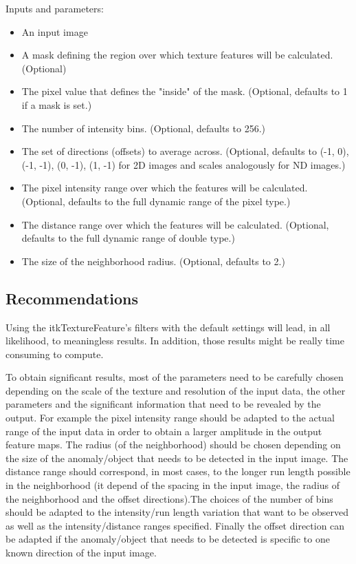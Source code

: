 \documentclass{InsightArticle}
\begin{document}
Inputs and parameters:
\begin{itemize}
 \item An input image
 \item A mask defining the region over which texture features will be calculated. (Optional)
 \item The pixel value that defines the "inside" of the mask. (Optional, defaults to 1 if a mask is set.)
 \item The number of intensity bins. (Optional, defaults to 256.)
 \item The set of directions (offsets) to average across. (Optional, defaults to {(-1, 0), (-1, -1), (0, -1), (1, -1)} for 2D images and scales analogously for ND images.)
 \item The pixel intensity range over which the features will be calculated. (Optional, defaults to the full dynamic range of the pixel type.)
 \item The distance range over which the features will be calculated. (Optional, defaults to the full dynamic range of double type.)
 \item The size of the neighborhood radius. (Optional, defaults to 2.)
\end{itemize}

\subsection{Recommendations}
\label{sec:recommendations}

Using the itkTextureFeature's filters with the default settings will lead, in all likelihood, to meaningless results. In addition, those results might be really time consuming to compute.

To obtain significant results, most of the parameters need to be carefully chosen depending on the scale of the texture and resolution of the input data, the other parameters and the significant information that need to be revealed by the output. For example the pixel intensity range should be adapted to the actual range of the input data in order to obtain a larger amplitude in the output feature maps. The radius (of the neighborhood) should be chosen depending on the size of the anomaly/object that needs to be detected in the input image. The distance range should correspond, in most cases, to the longer run length possible in the neighborhood (it depend of the spacing in the input image, the radius of the neighborhood and the offset directions).The choices of the number of bins should be adapted to the intensity/run length variation that want to be observed as well as the intensity/distance ranges specified. Finally the offset direction can be adapted if the anomaly/object that needs to be detected is specific to one known direction of the input image.
\end{document}
